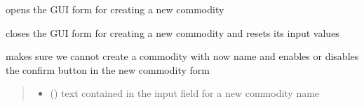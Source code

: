 \documentclass[letterpaper,10pt,english]{sphinxmanual}
\begin{document}
\begin{fulllineitems}
\label{\detokenize{docs_gui/js_api/urbs_editor/commodity_editor:openNewCommodityForm}}
\pysigstartsignatures
{}
\pysigstopsignatures
\sphinxAtStartPar
opens the GUI form for creating a new commodity

\end{fulllineitems}


\begin{fulllineitems}
\label{\detokenize{docs_gui/js_api/urbs_editor/commodity_editor:closeNewCommodityForm}}
\pysigstartsignatures
{}
\pysigstopsignatures
\sphinxAtStartPar
closes the GUI form for creating a new commodity and resets its input values

\end{fulllineitems}


\begin{fulllineitems}
\label{\detokenize{docs_gui/js_api/urbs_editor/commodity_editor:commodityFormCheckValidInput}}
\pysigstartsignatures
{}
\pysigstopsignatures
\sphinxAtStartPar
makes sure we cannot create a commodity with now name and
enables or disables the confirm button in the new commodity form
\begin{quote}\begin{description}
\begin{itemize}
\item {} 
\sphinxAtStartPar
{} () \textendash{} text contained in the input field for a new commodity name

\end{itemize}

\end{description}\end{quote}

\end{fulllineitems}
\end{document}
